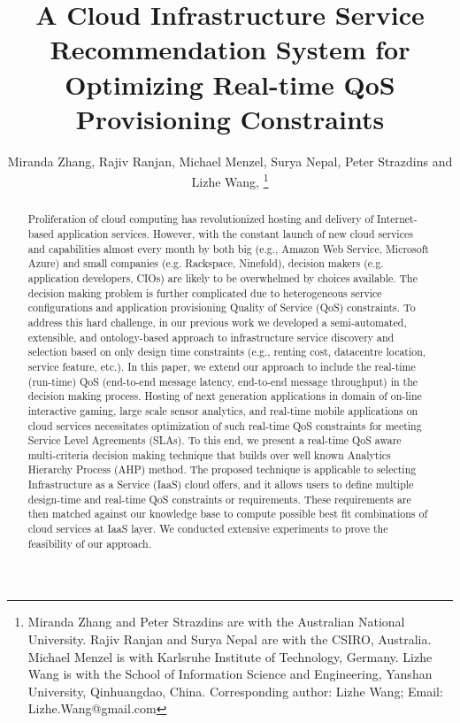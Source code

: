 \documentclass[journal]{IEEEtran}
\begin{document}
\title{A Cloud Infrastructure Service Recommendation System for Optimizing Real-time QoS Provisioning Constraints}


\author{
Miranda Zhang, Rajiv Ranjan, Michael Menzel, Surya Nepal, Peter Strazdins and  Lizhe Wang, 
\thanks{Miranda Zhang  and Peter Strazdins  are  with the Australian National University. Rajiv Ranjan and  Surya Nepal  are   with the CSIRO, Australia.  Michael Menzel is with Karlsruhe Institute of Technology, Germany. Lizhe Wang  is with the School of Information Science and Engineering, Yanshan University, Qinhuangdao, China. 
   Corresponding author: Lizhe Wang; Email: Lizhe.Wang@gmail.com
 }
 }


\maketitle


\begin{abstract}
Proliferation of cloud computing has revolutionized hosting and delivery of Internet-based application services. However, with the constant launch of new cloud services and capabilities almost every month by both big (e.g., Amazon Web Service, Microsoft Azure) and small companies (e.g. Rackspace, Ninefold), decision makers (e.g. application developers, CIOs) are likely to be overwhelmed by choices available. The decision making problem is further complicated due to heterogeneous service configurations and application provisioning Quality of Service (QoS) constraints. To address this hard challenge, in our previous work we developed a semi-automated, extensible, and ontology-based approach to infrastructure service discovery and selection based on only design time constraints (e.g., renting cost, datacentre location, service feature, etc.). In this paper, we extend our approach to include the real-time (run-time) QoS (end-to-end message latency, end-to-end message throughput) in the decision making process. Hosting of next generation applications in domain of on-line interactive gaming, large scale sensor analytics, and real-time mobile applications on cloud services necessitates optimization of such real-time QoS constraints for meeting Service Level Agreements (SLAs).  To this end, we present a real-time QoS aware multi-criteria decision making technique that builds over well known Analytics Hierarchy Process (AHP) method. The proposed technique is applicable to selecting Infrastructure as a Service (IaaS) cloud offers, and it allows users to define multiple design-time and real-time QoS constraints or requirements. These requirements are then matched against our knowledge base to compute possible best fit combinations of cloud services at IaaS layer.  We conducted extensive experiments to prove the feasibility of our approach.
\end{abstract}
\end{document}
